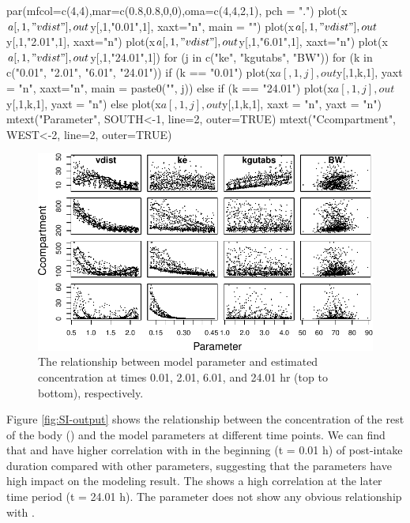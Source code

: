 \begin{Schunk}
\begin{Sinput}
par(mfcol=c(4,4),mar=c(0.8,0.8,0,0),oma=c(4,4,2,1), pch = ".")
plot(x$a[,1,"vdist"], out$y[,1,"0.01",1], xaxt="n", main = "\nvdist")
plot(x$a[,1,"vdist"], out$y[,1,"2.01",1], xaxt="n")
plot(x$a[,1,"vdist"], out$y[,1,"6.01",1], xaxt="n")
plot(x$a[,1,"vdist"], out$y[,1,"24.01",1])
for (j in c("ke", "kgutabs", "BW")){
  for (k in c("0.01", "2.01", "6.01", "24.01")){
    if (k == "0.01") {
      plot(x$a[,1,j], out$y[,1,k,1], yaxt = "n", xaxt="n", main = paste0("\n", j))
    } else if (k == "24.01") {
      plot(x$a[,1,j], out$y[,1,k,1], yaxt = "n")
      } else plot(x$a[,1,j], out$y[,1,k,1], xaxt = "n", yaxt = "n")
  }
}
mtext("Parameter", SOUTH<-1, line=2, outer=TRUE)
mtext("Ccompartment", WEST<-2, line=2, outer=TRUE)
\end{Sinput}
\begin{figure}

{\centering \includegraphics[width=0.95\linewidth]{RJ-pksensi_files/figure-latex/unnamed-chunk-13-1} 

}

\caption{\label{fig:SI-output}The relationship between model parameter and estimated concentration at times 0.01, 2.01, 6.01, and 24.01 hr (top to bottom), respectively.}\label{fig:unnamed-chunk-13}
\end{figure}
\end{Schunk}

Figure \ref{fig:SI-output} shows the relationship between the
concentration of the rest of the body () and the
model parameters at different time points. We can find that
 and  have higher correlation with
 in the beginning (t = 0.01 h) of post-intake
duration compared with other parameters, suggesting that the parameters
have high impact on the modeling result. The  shows a high
correlation at the later time period (t = 24.01 h). The parameter
 does not show any obvious relationship with
.

